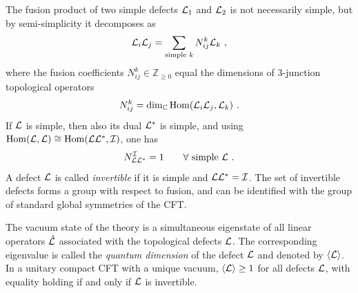 \documentclass[11pt,reqno]{article}
\newcommand{\be}{\begin{equation}}
\newcommand{\ee}{\end{equation}}
\newcommand{\CI}{{\cal I}}
\newcommand{\CL}{{\cal L}}
\newcommand{\ZZ}{\mathbb{Z}}
\newcommand{\CC}{\mathbb{C}}
\DeclareMathOperator{\Hom}{Hom}
\begin{document}
The fusion product of two simple defects $\CL_1$ and $\CL_2$ is not necessarily simple, but by semi-simplicity it decomposes as
\be \CL_i\CL_j=\sum_{\text{simple }k} N_{ij}^k\CL_k\ ,
\ee where the fusion coefficients $N_{ij}^k\in \ZZ_{\ge 0}$  equal the dimensions of $3$-junction topological operators
\be N_{ij}^k=\dim_\CC \Hom (\CL_i\CL_j,\CL_k)\ .
\ee If $\CL$ is simple, then also its dual $\CL^*$ is simple, and using $\Hom(\CL,\CL)\cong \Hom(\CL\CL^*,\CI)$, one has 
\be N_{\CL\CL^*}^\CI=1\qquad \forall \text{ simple }\CL\ .
\ee A defect $\CL$ is called \emph{invertible} if it is simple and $\CL\CL^*=\CI$. The set of invertible defects forms a group with respect to fusion, and can be identified with the group of standard global symmetries of the CFT.

The vacuum state of the theory is a simultaneous eigenstate of all linear operators $\hat\CL$ associated with the topological defects $\CL$. The corresponding eigenvalue is called the \emph{quantum dimension} of the defect $\CL$ and denoted by $\langle \CL\rangle$. In a unitary compact CFT with a unique vacuum, $\langle \CL\rangle\ge 1$ for all defects $\CL$, with equality holding if and only if $\CL$ is invertible. 









 
%

%

 
 \printbibliography

 
\end{document}
